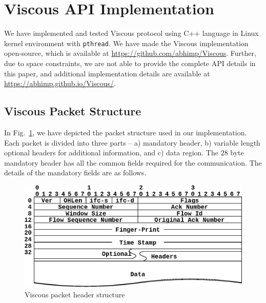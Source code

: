 \section{Viscous API Implementation}
We have implemented and tested Viscous protocol using C++ language in Linux kernel environment with \texttt{pthread}. We have made the Viscous implementation open-source, which is available at \url{https://github.com/abhimp/Viscous}. Further, due to space constraints, we are not able to provide the complete API details in this paper, and additional implementation details are available at \url{https://abhimp.github.io/Viscous/}.  



\subsection{Viscous Packet Structure}
In Fig.~\ref{fig:packet_format}, we have depicted the packet structure used in our implementation. 
Each packet is divided into three parts -- a) mandatory header, b) variable length optional headers for additional information, and c) data region. The $28$ byte mandatory header has all the common fields required for the communication. The details of the mandatory fields are as follows. 
%
\begin{figure}[!t]
    \centering
    \includegraphics[width=0.85\linewidth]{img/Packet_format.eps}
    \caption{Viscous packet header structure}
    \label{fig:packet_format}
\end{figure}
 

